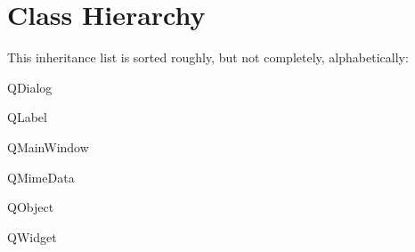 \section{Class Hierarchy}
This inheritance list is sorted roughly, but not completely, alphabetically\+:\begin{DoxyCompactList}
\item {}
\item Q\+Dialog\begin{DoxyCompactList}
\item {}
\end{DoxyCompactList}
\item Q\+Label\begin{DoxyCompactList}
\item {}
\end{DoxyCompactList}
\item Q\+Main\+Window\begin{DoxyCompactList}
\item {}
\end{DoxyCompactList}
\item Q\+Mime\+Data\begin{DoxyCompactList}
\item {}
\end{DoxyCompactList}
\item Q\+Object\begin{DoxyCompactList}
\item {}
\item {}
\item {}
\end{DoxyCompactList}
\item Q\+Widget\begin{DoxyCompactList}
\item {}
\item {}
\begin{DoxyCompactList}
\item {}
\item {}
\end{DoxyCompactList}
\item {}
\item {}
\end{DoxyCompactList}
\end{DoxyCompactList}
